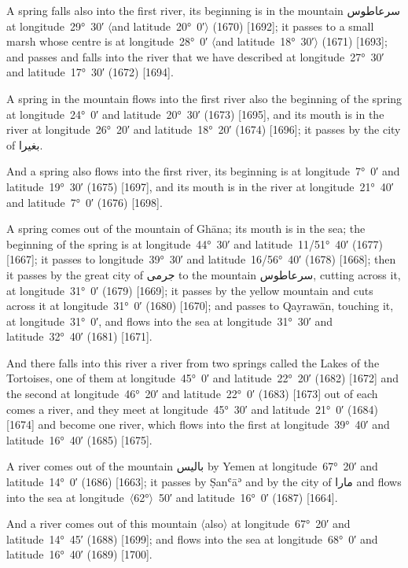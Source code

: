 \documentclass[11pt]{article}
\newcommand{\Pg}[1]{\marginpar{\footnotesize #1}}
\newcommand{\Ang}[1]{\ensuremath{#1}}
\begin{document}
A spring falls also into the first river, its beginning is in the mountain \textarabic{سرعاطوس} at longitude~29°~30′ \Ang{\langle}and latitude~20°~0′\Ang{\rangle} (1670) [1692]; it passes to a small marsh whose centre is at longitude~28°~0′ \Ang{\langle}and latitude~18°~30′\Ang{\rangle} (1671) [1693]; and passes and falls into the river that we have described at longitude~27°~30′ and latitude~17°~30′ (1672) [1694]\Pg{p. 111}.

A spring in the mountain flows into the first river also the beginning of the spring at longitude~24°~0′ and latitude~20°~30′ (1673) [1695], and its mouth is in the river at longitude~26°~20′ and latitude~18°~20′ (1674) [1696]; it passes by the city of \textarabic{بغيرا}.

And a spring also flows into the first river, its beginning is at longitude~7°~0′ and latitude~19°~30′ (1675) [1697], and its mouth is in the river at longitude~21°~40′ and latitude~7°~0′ (1676) [1698].

A spring comes out of the mountain of Ghāna; its mouth is in the sea; the beginning of the spring is at longitude~44°~30′ and latitude~11/51°~40′ (1677) [1667]; it passes to longitude~39°~30′ and latitude~16/56°~40′ (1678) [1668]; then it passes by the great city of \textarabic{جرمى} to the mountain \textarabic{سرعاطوس}, cutting across it, at longitude~31°~0′ (1679) [1669]; it passes by the yellow mountain and cuts across it at longitude~31°~0′ (1680) [1670]; and passes to Qayrawān, touching it, at longitude~31°~0′, and flows into the sea at longitude~31°~30′ and latitude~32°~40′ (1681) [1671].

And there falls into this river a river from two springs called the Lakes of the Tortoises, one of them at longitude~45°~0′ and latitude~22°~20′ (1682) [1672] and the second at longitude~46°~20′ and latitude~22°~0′ (1683) [1673] out of each comes a river, and they meet at longitude~45°~30′ and latitude~21°~0′ (1684) [1674] and become one river, which flows into the first at longitude~39°~40′ and latitude~16°~40′ (1685) [1675].

A river comes out of the mountain \textarabic{باليس} by Yemen at longitude~67°~20′ and latitude~14°~0′ (1686) [1663]; it passes by Ṣanʿāʾ and by the city of \textarabic{مارا} and flows into the sea at longitude~\Ang{\langle}62°\Ang{\rangle}~50′ and latitude~16°~0′ (1687) [1664]\Pg{p. 112}.

And a river comes out of this mountain \Ang{\langle}also\Ang{\rangle} at longitude~67°~20′ and latitude~14°~45′ (1688) [1699]; and flows into the sea at longitude~68°~0′ and latitude~16°~40′ (1689) [1700].
\end{document}
